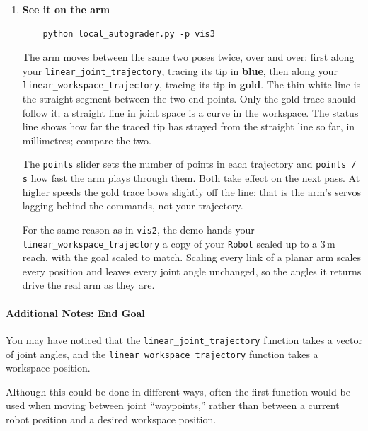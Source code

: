 \documentclass{16384_doc}
\begin{document}
\begin{questions}
\begin{enumerate} [label=\alph*.]
        \textbf{Note: You do not have to submit anything for this part; however,
        you should use this to detect any problems with your code before
        continuing!}

        \item \textbf{See it on the arm}

\begin{verbatim}
    python local_autograder.py -p vis3
\end{verbatim}

        The arm moves between the same two poses twice, over and over: first
        along your \verb!linear_joint_trajectory!, tracing its tip in
        \textbf{blue}, then along your \verb!linear_workspace_trajectory!,
        tracing its tip in \textbf{gold}. The thin white line is the straight
        segment between the two end points. Only the gold trace should follow
        it; a straight line in joint space is a curve in the workspace. The
        status line shows how far the traced tip has strayed from the straight
        line so far, in millimetres; compare the two.

        The \verb!points! slider sets the number of points in each trajectory
        and \verb!points / s! how fast the arm plays through them. Both take
        effect on the next pass. At higher speeds the gold trace bows slightly
        off the line: that is the arm's servos lagging behind the commands, not
        your trajectory.

        For the same reason as in \verb!vis2!, the demo hands your
        \verb!linear_workspace_trajectory! a copy of your \verb!Robot! scaled up
        to a 3\,m reach, with the goal scaled to match. Scaling every link of a
        planar arm scales every position and leaves every joint angle unchanged,
        so the angles it returns drive the real arm as they are.

    \end{enumerate}

    \paragraph{Additional Notes: End Goal}

    You may have noticed that the \verb!linear_joint_trajectory! function takes
    a vector of joint angles, and the \verb!linear_workspace_trajectory!
    function takes a workspace position.

    Although this could be done in different ways, often the first function
    would be used when moving between joint ``waypoints,'' rather than between a
    current robot position and a desired workspace position.


\end{questions}
\end{document}
